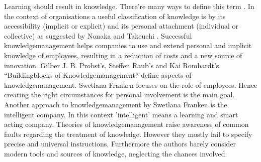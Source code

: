 \documentclass[12pt]{article}
\begin{document}
Learning should result in knowledge. There're many ways to define this term 
\cite{Schilcher:2006}. In the context of organisations a useful classification
of knowledge is by its accessibility (implicit or explicit) and its personal 
attachment (individual or collective) as suggested by Nonaka and Takeuchi
\cite{Nonaka:1997}.
Successful knowledgemanagement helps companies to use and extend personal and
implicit knowledge of employees, resulting in a reduction of costs and 
a new source of innovation. Gilber J. B. Probst's, Steffen Raub's and 
Kai Romhardt's ``Buildingblocks of Knowledgemanagement'' \cite{Probst:2006}
define aspects of knowledgemanagement. 
Swetlana Franken \cite{Franken:2007} focuses on the role of employees. Hence 
creating the right circumstances for personal involvement is the main goal. 
Another approach to knowledgemanagement by Swetlana Franken is the intelligent 
company. In this context 'intelligent' means a learning and smart acting company. 
Theories of knowledgemanagement raise awareness of common faults regarding the 
treatment of knowledge.
However they mostly fail to specify precise and universal instructions. 
Furthermore the authors barely consider modern tools and sources of knowledge, 
neglecting the chances involved.




\nocite{*}


\end{document}
